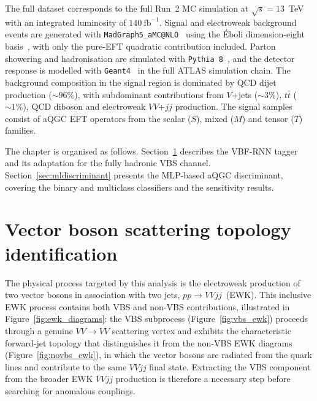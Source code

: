 The full dataset corresponds to the full Run~2 MC simulation at $\sqrt{s} = 13$~TeV with an integrated luminosity of $140~\text{fb}^{-1}$. Signal and electroweak background events are generated with \texttt{MadGraph5\_aMC@NLO}~\cite{Alwall:2014MG5} using the Éboli dimension-eight basis~\cite{Eboli_2016}, with only the pure-EFT quadratic contribution included. Parton showering and hadronisation are simulated with \texttt{Pythia 8}~\cite{Sjostrand:2015Pythia8}, and the detector response is modelled with \texttt{Geant4}~\cite{Agostinelli:2003Geant4} in the full ATLAS simulation chain. The background composition in the signal region is dominated by QCD dijet production ($\sim\!96\%$), with subdominant contributions from $V$+jets ($\sim\!3\%$), $t\bar{t}$ ($\sim\!1\%$), QCD diboson and electroweak $VV$+$jj$ production. The signal samples consist of aQGC EFT operators from the scalar ($S$), mixed ($M$) and tensor ($T$) families.

The chapter is organised as follows. Section~\ref{sec:vbfrnn} describes the VBF-RNN tagger and its adaptation for the fully hadronic VBS channel. Section~\ref{sec:mldiscriminant} presents the MLP-based aQGC discriminant, covering the binary and multiclass classifiers and the sensitivity results.

\section{Vector boson scattering topology identification}
\label{sec:vbfrnn}

The physical process targeted by this analysis is the electroweak production of two vector bosons in association with two jets, $pp \to VVjj$~(EWK). This inclusive EWK process contains both VBS and non-VBS contributions, illustrated in Figure~\ref{fig:ewk_diagrams}: the VBS subprocess (Figure~\ref{fig:vbs_ewk}) proceeds through a genuine $VV \to VV$ scattering vertex and exhibits the characteristic forward-jet topology that distinguishes it from the non-VBS EWK diagrams (Figure~\ref{fig:novbs_ewk}), in which the vector bosons are radiated from the quark lines and contribute to the same $VVjj$ final state. Extracting the VBS component from the broader EWK $VVjj$ production is therefore a necessary step before searching for anomalous couplings.

